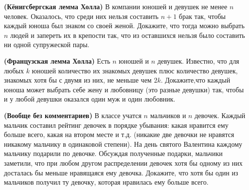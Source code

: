 \documentclass{article}
\begin{document}
\begin{enumerate_boxed}
        \item \textbf{(Кёнигсбергская лемма Холла)} В компании юношей и девушек не менее $n$ человек.
        Оказалось, что среди них нельзя составить $n + 1$ брак так, чтобы каждый юноша был знаком со своей женой.
        Докажите, что тогда можно выбрать $n$ людей и запереть их в крепости так, что из оставшихся нельзя было составить ни одной супружеской пары.


        \item \textbf{(Французская лемма Холла)} Есть $n$ юношей и $n$ девушек.
        Известно, что для любых $k$ юношей количество их знакомых девушек плюс количество девушек, знакомых хотя бы с двумя из них, не меньше чем $2k$.
        Докажите,что каждый юноша может выбрать себе жену и любовницу (это разные девушки) так, чтобы и у любой девушки оказался один муж и один любовник.


        \item \textbf{(Вообще без комментариев)} В классе учатся $n$
        мальчиков и $n$ девочек.
        Каждый мальчик составил рейтинг девочек в порядке убывания: какая нравится ему больше всего, какая на втором месте и т.д. (никакие две девочки не нравятся никакому мальчику в одинаковой степени).
        На день святого Валентина каждому мальчику подарили по девочке.
        Обсуждая полученные подарки, мальчики заметили, что при любом другом распределении девочек хотя бы одному из них досталась бы меньше нравящаяся ему девочка.
        Докажите, что хотя бы один из мальчиков получил ту девочку, которая нравилась ему больше всего.

    \end{enumerate_boxed}
\end{document}
